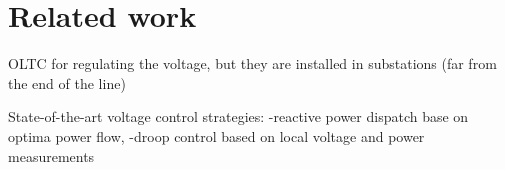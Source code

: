 \chapter{Related work}
OLTC for regulating the voltage, but they are installed in substations (far from the end of the line)

State-of-the-art voltage control strategies:
-reactive power dispatch base on optima power flow,
-droop control based on local voltage and power measurements
